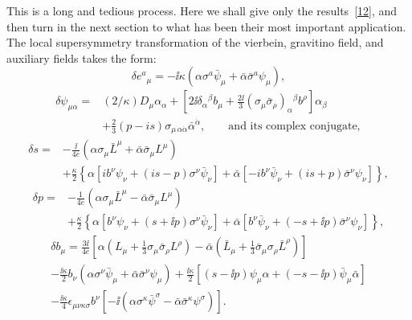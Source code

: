 This is a long and tedious process. Here we shall give only the
results~\hyperref[ch31-ref-12]{[12]}, and then turn in the next section
to what has been their most important application. The local
supersymmetry transformation of the vierbein, gravitino field, and
auxiliary fields takes the form:
\begin{equation}
  \delta e^a{}_\mu
  =-\ii\kappa\left(
    \alpha\sigma^a\bar\psi_\mu
    +\bar\alpha\bar\sigma^a\psi_\mu\right),
  \tag{31.6.1}\label{eq:31.6.1}
\end{equation}
\begin{equation}
  \begin{aligned}
  \delta\psi_{\mu\alpha}
  ={}&(2/\kappa)D_\mu\alpha_\alpha
  +\left[
    2\ii\delta_\alpha{}^\beta b_\mu
    +\frac{2\ii}{3}
      (\sigma_\mu\bar\sigma_\rho)_\alpha{}^\beta b^\rho
  \right]\alpha_\beta\\
  &+\frac{2}{3}(p-is)
    \sigma_{\mu\,\alpha\dot\alpha}\bar\alpha^{\dot\alpha},
  \qquad\text{and its complex conjugate},
  \end{aligned}
  \tag{31.6.2}\label{eq:31.6.2}
\end{equation}
\begin{equation}
  \begin{aligned}
  \delta s
  ={}&-\frac{\ii}{4e}\left(
    \alpha\sigma_\mu\bar L^\mu
    +\bar\alpha\bar\sigma_\mu L^\mu\right)\\
  &+\frac{\kappa}{2}\left\{
    \alpha\left[
      ib^\nu\psi_\nu+(is-p)\sigma^\nu\bar\psi_\nu
    \right]
    +\bar\alpha\left[
      -ib^\nu\bar\psi_\nu+(is+p)\bar\sigma^\nu\psi_\nu
    \right]\right\},
  \end{aligned}
  \tag{31.6.3}\label{eq:31.6.3}
\end{equation}
\begin{equation}
  \begin{aligned}
  \delta p
  ={}&-\frac{1}{4e}\left(
    \alpha\sigma_\mu\bar L^\mu
    -\bar\alpha\bar\sigma_\mu L^\mu\right)\\
  &+\frac{\kappa}{2}\left\{
    \alpha\left[
      b^\nu\psi_\nu+(s+\ii p)\sigma^\nu\bar\psi_\nu
    \right]
    +\bar\alpha\left[
      b^\nu\bar\psi_\nu+(-s+\ii p)\bar\sigma^\nu\psi_\nu
    \right]\right\},
  \end{aligned}
  \tag{31.6.4}\label{eq:31.6.4}
\end{equation}
\begin{multline}
  \delta b_\mu
  =\frac{3\ii}{4e}
    \left[
      \alpha\left(L_\mu+\frac13\sigma_\mu\bar\sigma_\rho L^\rho\right)
      -\bar\alpha\left(
        \bar L_\mu+\frac13\bar\sigma_\mu\sigma_\rho\bar L^\rho
      \right)
    \right]\\
  -\frac{\ii\kappa}{2}b_\nu
    \left(\alpha\sigma^\nu\bar\psi_\mu
          +\bar\alpha\bar\sigma^\nu\psi_\mu\right)
  +\frac{\ii\kappa}{2}
    \left[(s-\ii p)\psi_\mu\alpha
          +(-s-\ii p)\bar\psi_\mu\bar\alpha\right]\\
  -\frac{\ii\kappa}{4}\epsilon_{\mu\nu\kappa\sigma}b^\nu
    \left[-\ii\left(
      \alpha\sigma^\kappa\bar\psi^\sigma
      -\bar\alpha\bar\sigma^\kappa\psi^\sigma
    \right)\right].
  \tag{31.6.5}\label{eq:31.6.5}
\end{multline}
